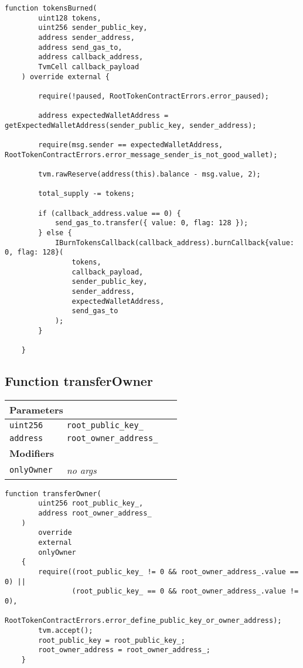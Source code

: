 \begin{lstlisting}[firstnumber=347]
    function tokensBurned(
        uint128 tokens,
        uint256 sender_public_key,
        address sender_address,
        address send_gas_to,
        address callback_address,
        TvmCell callback_payload
    ) override external {

        require(!paused, RootTokenContractErrors.error_paused);

        address expectedWalletAddress = getExpectedWalletAddress(sender_public_key, sender_address);

        require(msg.sender == expectedWalletAddress, RootTokenContractErrors.error_message_sender_is_not_good_wallet);

        tvm.rawReserve(address(this).balance - msg.value, 2);

        total_supply -= tokens;

        if (callback_address.value == 0) {
            send_gas_to.transfer({ value: 0, flag: 128 });
        } else {
            IBurnTokensCallback(callback_address).burnCallback{value: 0, flag: 128}(
                tokens,
                callback_payload,
                sender_public_key,
                sender_address,
                expectedWalletAddress,
                send_gas_to
            );
        }

    }
\end{lstlisting}

\subsection{Function transferOwner}


\ifsoltables
\noindent\begin{tabular}{|l|l|p{5cm}|}\hline
\multicolumn{3}{|l|}{\bf Parameters}\\\hline
\tt uint256 & \tt root\_{}public\_{}key\_{} &\\\hline
\tt address & \tt root\_{}owner\_{}address\_{} &\\\hline
\multicolumn{3}{|l|}{\bf Modifiers}\\\hline
\tt onlyOwner & {\em no args} &\\\hline
\end{tabular}
\fi

\vspace{2cm}

\begin{lstlisting}[firstnumber=440]
    function transferOwner(
        uint256 root_public_key_,
        address root_owner_address_
    )
        override
        external
        onlyOwner
    {
        require((root_public_key_ != 0 && root_owner_address_.value == 0) ||
                (root_public_key_ == 0 && root_owner_address_.value != 0),
                RootTokenContractErrors.error_define_public_key_or_owner_address);
        tvm.accept();
        root_public_key = root_public_key_;
        root_owner_address = root_owner_address_;
    }
\end{lstlisting}

